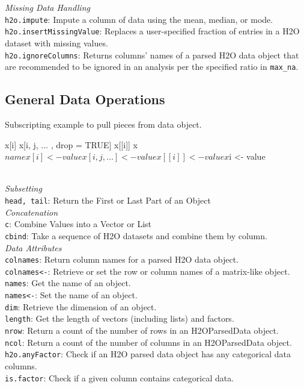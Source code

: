 \documentclass[11pt]{article}
\begin{document}
\begin{enumerate}
{\textit{Missing Data Handling}\\

{\texttt{h2o.impute}}: Impute a column of data using the mean, median, or mode.\\
{\texttt{h2o.insertMissingValue}}: Replaces a user-specified fraction of entries in a H2O dataset with missing values.\\
{\texttt{h2o.ignoreColumns}}: Returns columns' names of a parsed H2O data object that are recommended to be ignored in an analysis per the specified ratio in {\texttt{max\_na}}.\\

\subsection{General Data Operations}

Subscripting example to pull pieces from data object. 
\begin{spverbatim}
  x[i]
  x[i, j, ... , drop = TRUE]
  x[[i]]
  x$name

  x[i] <- value
  x[i, j, ...] <- value
  x[[i]] <- value
  x$i <- value

\end{spverbatim}
\\

\textit{Subsetting}\\

{\texttt{head, tail}}: Return the First or Last Part of an Object\\

\textit{Concatenation}
\\
 {\texttt{c}}: Combine Values into a Vector or List\\
 {\texttt{cbind}}: Take a sequence of H2O datasets and combine them by column.\\

\textit{Data Attributes}\\

{\texttt{colnames}}: Return column names for a parsed H2O data object. \\
{\texttt{colnames<-}}: Retrieve or set the row or column names of a matrix-like object.\\
{\texttt{names}}: Get the name of an object. \\
{\texttt{names<-}}: Set the name of an object. \\
{\texttt{dim}}: Retrieve the dimension of an object. \\
{\texttt{length}}: Get the length of vectors (including lists) and factors. \\
{\texttt{nrow}}: Return a count of the number of rows in an H2OParsedData object. \\
{\texttt{ncol}}: Return a count of the number of columns in an H2OParsedData object.\\
{\texttt{h2o.anyFactor}}: Check if an H2O parsed data object has any categorical data columns. \\
{\texttt{is.factor}}: Check if a given column contains categorical data.\\

}
\end{enumerate}
\end{document}
